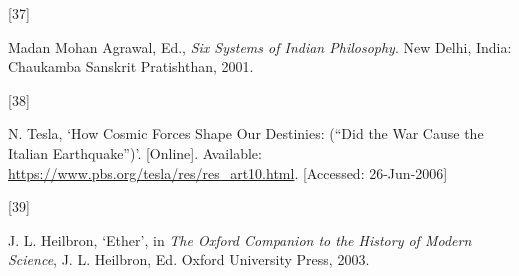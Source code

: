 \documentclass[
  12pt,
  british,
  a4paper,
  rgb,
  dvipsnames,
  svgnames,
  hyphens]{article}
\newlength{\cslhangindent}
\newlength{\csllabelwidth}
\newenvironment{CSLReferences}[2] %
 {%
  \setlength{\parindent}{0pt}
  \ifodd #1 \everypar{\setlength{\hangindent}{\cslhangindent}}\ignorespaces\fi
  \ifnum #2 > 0
  \setlength{\parskip}{#2\baselineskip}
  \fi
 }%
 {}
\newcommand{\CSLLeftMargin}[1]{\parbox[t]{\csllabelwidth}{#1}}
\newcommand{\CSLRightInline}[1]{\parbox[t]{\linewidth - \csllabelwidth}{#1}\break}
\begin{document}
\begin{CSLReferences}{0}{0}
\leavevmode{}%
\CSLLeftMargin{{[}37{]} }
\CSLRightInline{Madan Mohan Agrawal, Ed., \emph{{Six Systems of Indian
Philosophy}}. New Delhi, India: Chaukamba Sanskrit Pratishthan, 2001. }

\leavevmode{}%
\CSLLeftMargin{{[}38{]} }
\CSLRightInline{N. Tesla, {`{How Cosmic Forces Shape Our Destinies:
({``Did the War Cause the Italian Earthquake''})}'}. {[}Online{]}.
Available: \url{https://www.pbs.org/tesla/res/res_art10.html}.
{[}Accessed: 26-Jun-2006{]}}

\leavevmode{}%
\CSLLeftMargin{{[}39{]} }
\CSLRightInline{J. L. Heilbron, {`Ether'}, in \emph{{The Oxford
Companion to the History of Modern Science}}, J. L. Heilbron, Ed. Oxford
University Press, 2003. }

\end{CSLReferences}
\end{document}
